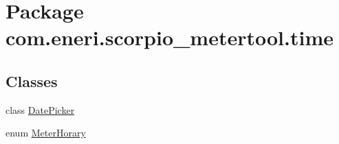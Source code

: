 \hypertarget{namespacecom_1_1eneri_1_1scorpio__metertool_1_1time}{}\section{Package com.\+eneri.\+scorpio\+\_\+metertool.\+time}
\label{namespacecom_1_1eneri_1_1scorpio__metertool_1_1time}
\subsection*{Classes}
\begin{DoxyCompactItemize}
\item 
class \hyperlink{classcom_1_1eneri_1_1scorpio__metertool_1_1time_1_1_date_picker}{Date\+Picker}
\item 
enum \hyperlink{enumcom_1_1eneri_1_1scorpio__metertool_1_1time_1_1_meter_horary}{Meter\+Horary}
\end{DoxyCompactItemize}
